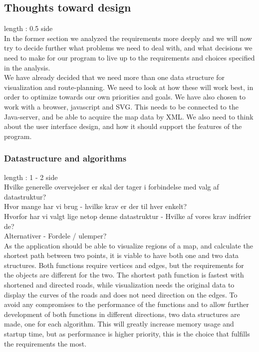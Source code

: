 \documentclass[a4paper,10pt,titlepage]{article}
\begin{document}
		
		\subsection{Thoughts toward design}
			length : 0.5 side\\
			In the former section we analyzed the requirements more deeply and we will now try to decide further what problems we need to deal with, and what decisions we need to make for our program to live up to the requirements and choices specified in the analysis.\\

We have already decided that we need more than one data structure for visualization and route-planning. We need to look at how these will work best, in order to optimize towards our own priorities and goals. We have also chosen to work with a browser, javascript and SVG. This needs to be connected to the Java-server, and be able to acquire the map data by XML. We also need to think about the user interface design, and how it should support the features of the program.\\
			\subsubsection{Datastructure and algorithms}
				length : 1 - 2 side\\
				Hvilke generelle overvejelser er skal der tager i forbindelse med valg af datastruktur? \\
				Hvor mange har vi brug - hvilke krav er der til hver enkelt?\\
				Hvorfor har vi valgt lige netop denne datastruktur - Hvilke af vores krav indfrier de?\\
				Alternativer - Fordele / ulemper?\\

				As the application should be able to visualize regions of a map, and calculate the shortest path between two points, it is viable to have both one and two data structures. Both functions require vertices and edges, but the requirements for the objects are different for the two. The shortest path function is fastest with shortened and directed roads, while visualization needs the original data to display the curves of the roads and does not need direction on the edges. To avoid any compromises to the performance of the functions and to allow further development of both functions in different directions, two data structures are made, one for each algorithm. This will greatly increase memory usage and startup time, but as performance is higher priority, this is the choice that fulfills the requirements the most.
\end{document}
